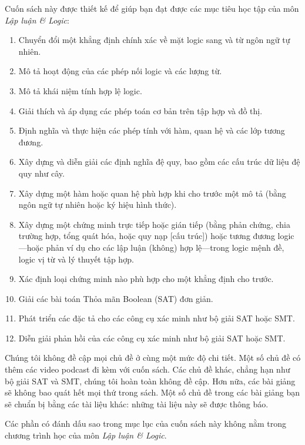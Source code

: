 Cuốn sách này được thiết kế để giúp bạn đạt được các mục tiêu học tập của môn \textit{Lập luận \& Logic}:

\begin{enumerate}
    \item Chuyển đổi một khẳng định chính xác về mặt logic sang và từ ngôn ngữ tự nhiên.
    \item Mô tả hoạt động của các phép nối logic và các lượng từ.
    \item Mô tả khái niệm tính hợp lệ logic.
    \item Giải thích và áp dụng các phép toán cơ bản trên tập hợp và đồ thị.
    \item Định nghĩa và thực hiện các phép tính với hàm, quan hệ và các lớp tương đương.
    \item Xây dựng và diễn giải các định nghĩa đệ quy, bao gồm các cấu trúc dữ liệu đệ quy như cây.
    \item Xây dựng một hàm hoặc quan hệ phù hợp khi cho trước một mô tả (bằng ngôn ngữ tự nhiên hoặc ký hiệu hình thức).
    \item Xây dựng một chứng minh trực tiếp hoặc gián tiếp (bằng phản chứng, chia trường hợp, tổng quát hóa, hoặc quy nạp [cấu trúc]) hoặc tương đương logic---hoặc phản ví dụ cho các lập luận (không) hợp lệ---trong logic mệnh đề, logic vị từ và lý thuyết tập hợp.
    \item Xác định loại chứng minh nào phù hợp cho một khẳng định cho trước.
    \item Giải các bài toán Thỏa mãn Boolean (SAT) đơn giản.
    \item Phát triển các đặc tả cho các công cụ xác minh như bộ giải SAT hoặc SMT.
    \item Diễn giải phản hồi của các công cụ xác minh như bộ giải SAT hoặc SMT.
\end{enumerate}

\begin{warningbox}
Chúng tôi không đề cập mọi chủ đề ở cùng một mức độ chi tiết. Một số chủ đề có thêm các video podcast đi kèm với cuốn sách. Các chủ đề khác, chẳng hạn như bộ giải SAT và SMT, chúng tôi hoàn toàn không đề cập. Hơn nữa, các bài giảng sẽ không bao quát hết mọi thứ trong sách. Một số chủ đề trong các bài giảng bạn sẽ chuẩn bị bằng các tài liệu khác: những tài liệu này sẽ được thông báo.
\end{warningbox}

\begin{infobox}
Các phần có đánh dấu sao trong mục lục của cuốn sách này không nằm trong chương trình học của môn \textit{Lập luận \& Logic}.
\end{infobox}

